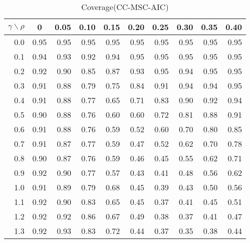 \documentclass[12pt]{article}
\begin{document}
%
\begin{table}[!tbp]
\caption{Coverage(CC-MSC-AIC)}
 \begin{center}
 \begin{tabular}{r|rrrrrrrrr}\hline\hline
\multicolumn{1}{c|}{$\gamma\backslash\rho$}&\multicolumn{1}{c}{0}&\multicolumn{1}{c}{0.05}&\multicolumn{1}{c}{0.10}&\multicolumn{1}{c}{0.15}&\multicolumn{1}{c}{0.20}&\multicolumn{1}{c}{0.25}&\multicolumn{1}{c}{0.30}&\multicolumn{1}{c}{0.35}&\multicolumn{1}{c}{0.40}\tabularnewline
\hline

0.0&0.95&0.95&0.95&0.95&0.95&0.95&0.95&0.95&0.95\tabularnewline
0.1&0.94&0.93&0.92&0.94&0.95&0.95&0.95&0.95&0.95\tabularnewline
0.2&0.92&0.90&0.85&0.87&0.93&0.95&0.94&0.95&0.95\tabularnewline
0.3&0.91&0.88&0.79&0.75&0.84&0.91&0.94&0.94&0.95\tabularnewline
0.4&0.91&0.88&0.77&0.65&0.71&0.83&0.90&0.92&0.94\tabularnewline
0.5&0.90&0.88&0.76&0.60&0.60&0.72&0.81&0.88&0.91\tabularnewline
0.6&0.91&0.88&0.76&0.59&0.52&0.60&0.70&0.80&0.85\tabularnewline
0.7&0.91&0.87&0.77&0.59&0.47&0.52&0.62&0.70&0.78\tabularnewline
0.8&0.90&0.87&0.76&0.59&0.46&0.45&0.55&0.62&0.71\tabularnewline
0.9&0.92&0.90&0.77&0.57&0.43&0.41&0.48&0.56&0.62\tabularnewline
1.0&0.91&0.89&0.79&0.68&0.45&0.39&0.43&0.50&0.56\tabularnewline
1.1&0.92&0.90&0.83&0.65&0.45&0.37&0.41&0.45&0.51\tabularnewline
1.2&0.92&0.92&0.86&0.67&0.49&0.38&0.37&0.41&0.47\tabularnewline
1.3&0.92&0.93&0.83&0.72&0.44&0.37&0.35&0.38&0.44\tabularnewline
\hline
\end{tabular}

\end{center}

\end{table}
\end{document}
